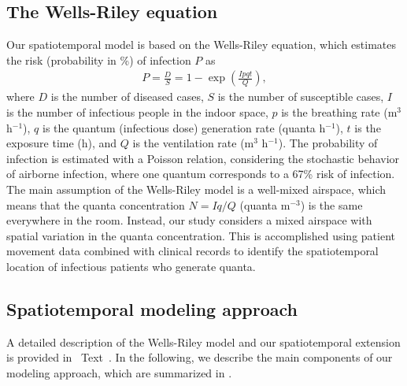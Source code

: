 \documentclass[fleqn,11pt]{wlscirep}
\begin{document}
\subsection{The Wells-Riley equation}

Our spatiotemporal model is based on the Wells-Riley equation\cite{Riley1978AJE}, which estimates the risk (probability in \%) of infection $P$ as
\begin{align}
    P = \frac{D}{S} = 1 - \exp\left(\frac{Ipqt}{Q}\right),
\end{align}
where $D$ is the number of diseased cases, $S$ is the number of susceptible cases, $I$ is the number of infectious people in the indoor space, $p$ is the breathing rate (m$^3$ h$^{-1}$), $q$ is the quantum (infectious dose) generation rate (quanta h$^{-1}$), $t$ is the exposure time (h), and $Q$ is the ventilation rate (m$^3$ h$^{-1}$). The probability of infection is estimated with a Poisson relation, considering the stochastic behavior of airborne infection, where one quantum corresponds to a 67\% risk of infection. The main assumption of the Wells-Riley model is a well-mixed airspace, which means that the quanta concentration $N = Iq/Q$ (quanta m$^{-3}$) is the same everywhere in the room. Instead, our study considers a mixed airspace with spatial variation in the quanta concentration. This is accomplished using patient movement data combined with clinical records to identify the spatiotemporal location of infectious patients who generate quanta.

\subsection{Spatiotemporal modeling approach}

A detailed description of the Wells-Riley model and our spatiotemporal extension is provided in \supp~Text~. In the following, we describe the main components of our modeling approach, which are summarized in .
\end{document}
